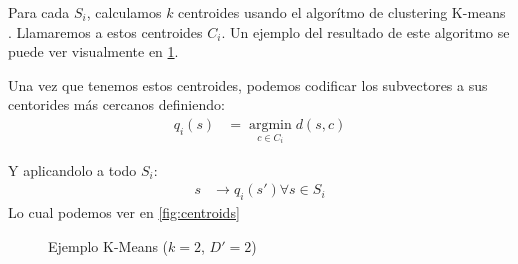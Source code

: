 Para cada \(S_i\), calculamos \(k\) centroides usando el algor\'itmo de 
clustering K-means \cite{wiki:K-means_clustering}. 
Llamaremos a estos centroides \(C_i\). 
Un ejemplo del resultado de este algoritmo se puede ver visualmente en 
\ref{fig:kmeans-ej}.

\newpage 

Una vez que tenemos estos centroides, podemos codificar los subvectores a sus 
centorides m\'as cercanos definiendo: 
\begin{align}
  q_i(s) &= \operatorname*{argmin}_{c \in C_i} d(s, c) 
\end{align}

Y aplicandolo a todo \(S_i\): 
\begin{align}
  s &\rightarrow q_i(s') \forall s \in S_i
\end{align}
Lo cual podemos ver en \ref{fig:centroids}

\begin{figure}
\centering
{}

\caption{Ejemplo K-Means ($k=2$, $D'=2$)}
\label{fig:kmeans-ej}
\end{figure}

